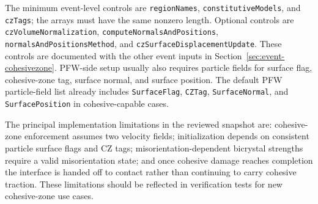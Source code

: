 The minimum event-level controls are \texttt{regionNames}, \texttt{constitutiveModels}, and \texttt{czTags}; the arrays must have the same nonzero length.  Optional controls are \texttt{czVolumeNormalization}, \texttt{computeNormalsAndPositions}, \texttt{normalsAndPositionsMethod}, and \texttt{czSurfaceDisplacementUpdate}.  These controls are documented with the other event inputs in Section~\ref{sec:event-cohesivezone}.  PFW-side setup usually also requires particle fields for surface flag, cohesive-zone tag, surface normal, and surface position.  The default PFW particle-field list already includes \texttt{SurfaceFlag}, \texttt{CZTag}, \texttt{SurfaceNormal}, and \texttt{SurfacePosition} in cohesive-capable cases.

The principal implementation limitations in the reviewed snapshot are: cohesive-zone enforcement assumes two velocity fields; initialization depends on consistent particle surface flags and CZ tags; misorientation-dependent bicrystal strengths require a valid misorientation state; and once cohesive damage reaches completion the interface is handed off to contact rather than continuing to carry cohesive traction.  These limitations should be reflected in verification tests for new cohesive-zone use cases.


